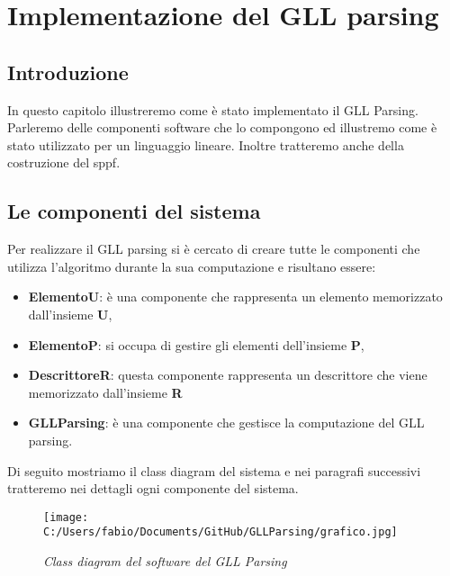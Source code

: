 \chapter{Implementazione del GLL parsing}
\section{Introduzione}
In questo capitolo illustreremo come è stato implementato il GLL Parsing. Parleremo delle componenti software che lo compongono ed illustremo come è stato utilizzato per un linguaggio lineare. Inoltre tratteremo anche della costruzione del sppf.
\section{Le componenti del sistema}
Per realizzare il GLL parsing si è cercato di creare tutte le componenti che utilizza l'algoritmo durante la sua computazione e risultano essere:
\begin{itemize}
	\item \textbf{ElementoU}: è una componente che rappresenta un elemento memorizzato dall'insieme \textbf{U},
	\item \textbf{ElementoP}: si occupa di gestire gli elementi dell'insieme \textbf{P},
	\item \textbf{DescrittoreR}: questa componente rappresenta un descrittore che viene memorizzato dall'insieme \textbf{R} 
	\item \textbf{GLLParsing}: è una componente che gestisce la computazione del GLL parsing.
\end{itemize}
Di seguito mostriamo il class diagram del sistema e nei paragrafi successivi tratteremo nei dettagli ogni componente del sistema.
\begin{figure}[h]
	\flushleft
	\texttt{[image: C:/Users/fabio/Documents/GitHub/GLLParsing/grafico.jpg]}
	\caption{\textit{Class diagram del software del GLL Parsing}}
\end{figure}
